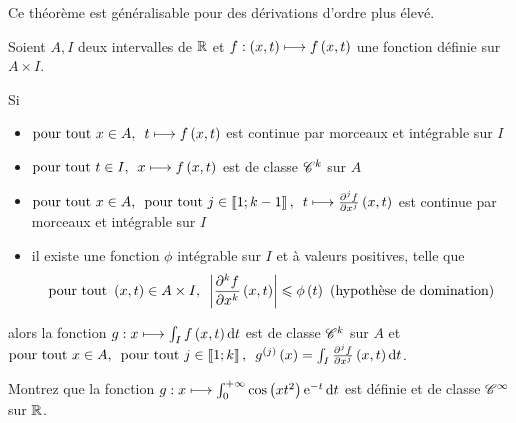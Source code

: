 Ce théorème est généralisable pour des dérivations d'ordre plus élevé.

\begin{theo}
Soient \(A,I\) deux intervalles de \(\mathbb{R}\) et \(f:\left(x,t\right)\longmapsto f\left(x,t\right)\) une fonction définie sur \(A\times I\).

Si

\begin{itemize}
    \item \(\quantifs{\tpt x\in A}t\mapsto f\paren{x,t}\) est continue par morceaux et intégrable sur \(I\) \\
    \item \(\quantifs{\tpt t\in I}x\mapsto f\paren{x,t}\) est de classe \(\mathscr{C}^{k}\) sur \(A\) \\
    \item \(\quantifs{\tpt x\in A;\tpt j\in\interventierii{1}{k-1}}t\mapsto\pdv[order=j]{f}{x}\paren{x,t}\) est continue par morceaux et intégrable sur \(I\) \\
    \item il existe une fonction \(\phi\) intégrable sur \(I\) et à valeurs positives, telle que \[\quantifs{\tpt\paren{x,t}\in A\times I}\abs{\pdv[order=k]{f}{x}\paren{x,t}}\leq\phi\paren{t}\text{ (hypothèse de domination)}\]
\end{itemize}

alors la fonction \(g:x\mapsto\int_If\paren{x,t}\odif{t}\) est de classe \(\mathscr{C}^{k}\) sur \(A\) et \(\quantifs{\tpt x\in A;\tpt j\in\interventierii{1}{k}}g\deriv{j}\paren{x}=\int_I\pdv[order=j]{f}{x}\paren{x,t}\odif{t}\).
\end{theo}

\begin{exo}
Montrez que la fonction \(g:x\mapsto\int_0^{\pinf}\cos\paren{xt^2}\e{-t}\odif{t}\) est définie et de classe \(\mathscr{C}^{\infty}\) sur \(\mathbb{R}\).
\end{exo}

